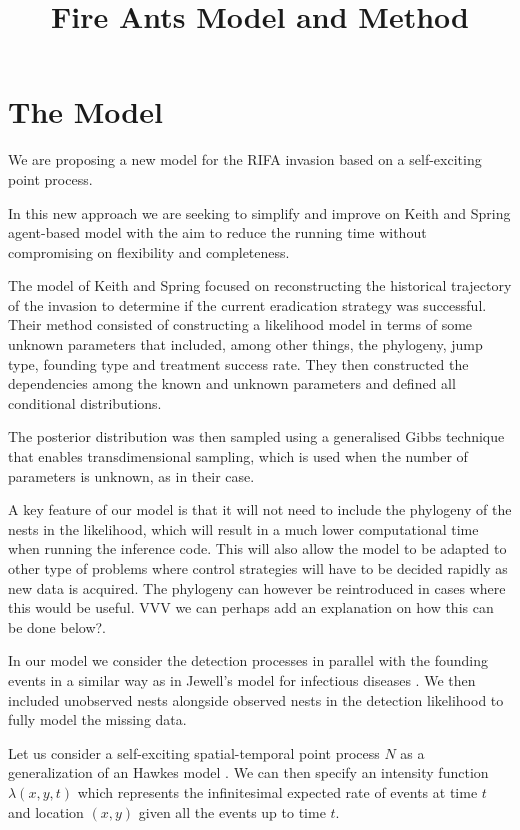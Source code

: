 \documentclass[11pt,a4paper]{article}
\title{Fire Ants Model and Method}
\begin{document}
 \maketitle

\section{The Model}

We are proposing a new model for the RIFA invasion based on a self-exciting point process.

In this new approach we are seeking to simplify and improve on Keith and Spring agent-based model \cite{Keith} with the aim to reduce the running time without compromising on flexibility and completeness.

The model of Keith and Spring focused on reconstructing the historical trajectory of the invasion to determine if the current eradication strategy was successful. Their method consisted of constructing a likelihood model in terms of some unknown parameters that included, among other things, the phylogeny, jump type, founding type and treatment success rate. They then constructed the dependencies among the known and unknown parameters and defined all conditional distributions.

The posterior distribution was then sampled using a generalised Gibbs technique that enables transdimensional sampling, which is used when the number of parameters is unknown, as in their case.

A key feature of our model is that it will not need to include the phylogeny of the nests in the likelihood, which will result in a much lower computational time when running the inference code. This will also allow the model to be adapted to other type of problems where control strategies will have to be decided rapidly as new data is acquired. {\color{red}The phylogeny can however be reintroduced in cases where this would be useful. VVV we can perhaps add an explanation on how this can be done below?}.

In our model we consider the detection processes in parallel with the founding events in a similar way as in Jewell's model for infectious diseases \cite{Jewell}. We then included unobserved nests alongside observed nests in the detection likelihood to fully model the missing data.

Let us consider a self-exciting spatial-temporal point process $N$ as a generalization of an Hawkes model {\color{red} \cite{Hawkes71}}. We can then specify an intensity function $\lambda(x, y, t)$ which represents the infinitesimal expected  rate of events at time $t$ and location $(x, y)$  given all the events up to time $t$.
\end{document}
